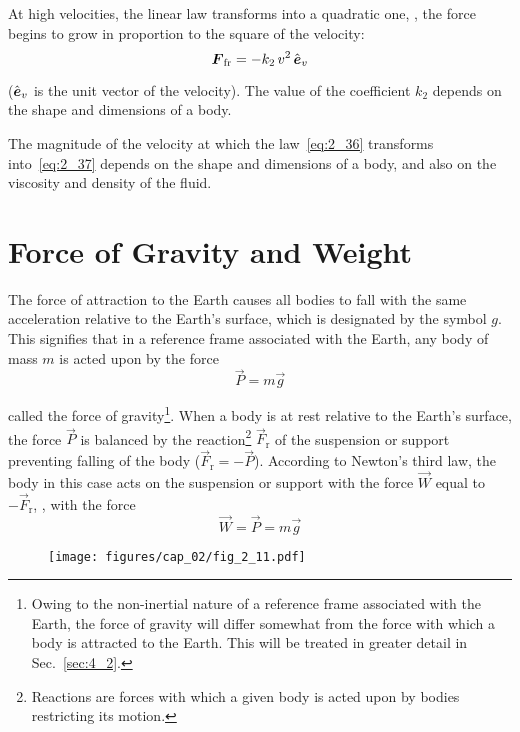 At high velocities, the linear law transforms into a quadratic one, \ie, the force begins to grow in proportion to the square of the velocity:
\begin{equation}\label{eq:2_37}
\boldsymbol{F}_{\text{fr}} = -k_2\, v^2\, \hat{\boldsymbol{e}}_{v}
\end{equation}

\noindent
($\hat{\boldsymbol{e}}_{v}$ is the unit vector of the velocity). The value of the coefficient $k_2$ depends on the shape and dimensions of a body.

The magnitude of the velocity at which the law~\eqref{eq:2_36} transforms into~\eqref{eq:2_37} depends on the shape and dimensions of a body, and also on the viscosity and density of the fluid.

\section{Force of Gravity and Weight}\label{sec:2_11}

The force of attraction to the Earth causes all bodies to fall with the same acceleration relative to the Earth's surface, which is designated by the symbol $g$. This signifies that in a reference frame associated with the Earth, any body of mass $m$ is acted upon by the force
\begin{equation}\label{eq:2_38}
\vec{P} = m\vec{g}
\end{equation}

\noindent
called the force of gravity\footnote{Owing to the non-inertial nature of a reference frame associated with the Earth, the force of gravity will differ somewhat from the force with which a body is attracted to the Earth. This will be treated in greater detail in Sec.~\ref{sec:4_2}.}. When a body is at rest relative to the Earth's surface, the force $\vec{P}$ is balanced by the reaction\footnote{Reactions are forces with which a given body is acted upon by bodies restricting its motion.} $\vec{F}_{\text{r}}$ of the suspension or support preventing falling of the body ($\vec{F}_{\text{r}}=-\vec{P}$). According to Newton's third law, the body in this case acts on the suspension or support with the force $\vec{W}$ equal to $-\vec{F}_{\text{r}}$, \ie, with the force
\begin{equation*}
\vec{W} = \vec{P} = m\vec{g}
\end{equation*}

\begin{figure}[t]
	\begin{center}
		\texttt{[image: figures/cap\_02/fig\_2\_11.pdf]}
		\caption[]{}
		\label{fig:2_11}
	\end{center}
	\vspace{-0.7cm}
\end{figure}


